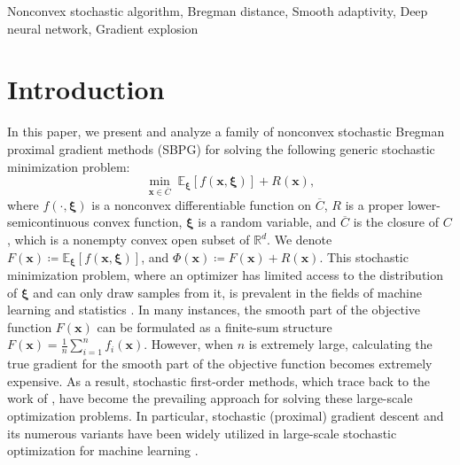 \documentclass[twoside,11pt]{article}
\newcommand{\R}{\mathbb R}
\newcommand{\E}{\mathbb{E}}
\DeclareMathOperator*{\argmin}{argmin}
\def\inprod#1#2{\langle#1,\,#2\rangle}
\def\vx{{\bm{x}}}
\begin{document}
\begin{keywords}
 Nonconvex stochastic algorithm, Bregman distance, Smooth adaptivity, Deep neural network, Gradient explosion
\end{keywords}

\section{Introduction}\label{sec-introduction}
In this paper, we present and analyze a family of nonconvex stochastic Bregman proximal gradient methods (SBPG) for solving the following generic stochastic minimization problem:
\begin{equation}
\min_{\vx\in \overline{C}}\;\E_{{\bm\xi}}[f(\vx,{\bm\xi})]+R(\vx),
\label{min-prob}
\end{equation}
where $f(\cdot,{\bm\xi})$ is a nonconvex differentiable function on $\overline{C}$, $R$ is a proper lower-semicontinuous convex function, ${\bm\xi}$ is a random variable, and $\overline{C}$ is the closure of $C$, which is a nonempty convex open subset of $\R^d$. We denote $F(\vx)\coloneqq\E_{{\bm\xi}}[f(\vx,{\bm\xi})]$, and $\Phi(\vx)\coloneqq F(\vx)+R(\vx)$. This stochastic minimization problem, where an optimizer has limited access to the distribution of ${\bm\xi}$ and can only draw samples from it, is prevalent in the fields of machine learning and statistics \citep{hastie2009elements,shapiro2021lectures,zhang2004solving}. In many instances, the smooth part of the objective function $F(\vx)$ can be formulated as a 
finite-sum structure $F(\vx)=\frac{1}{n}\sum_{i=1}^nf_i(\vx)$.
However, when $n$ is extremely large, calculating the true gradient for the smooth part of the objective function becomes extremely expensive. As a result, stochastic first-order methods, which trace back to the work of \citet{robbins1951stochastic}, have become the prevailing approach for solving these large-scale optimization problems. In particular, stochastic (proximal) gradient descent and its numerous variants \citep{duchi2011adaptive,duchi2009efficient,gu2020unified,kingma2014adam,JMLR:v18:16-410,wang2022riemannian} have been widely utilized in large-scale stochastic optimization for machine learning \citep{lecun2015deep,shapiro2021lectures,zhang2004solving}.
\end{document}
